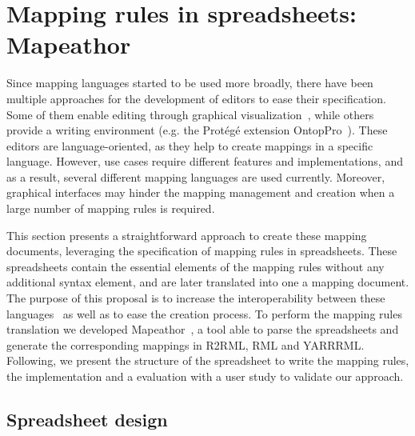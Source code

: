 \section{Mapping rules in spreadsheets: Mapeathor}
\label{sec:chp5_mapeathor}

Since mapping languages started to be used more broadly, there have been multiple approaches for the development of editors to ease their specification. Some of them enable editing through graphical visualization~\citep{heyvaert2016rmleditor,sicilia2017map}, while others provide a writing environment (e.g. the Protégé extension OntopPro~). These editors are language-oriented, as they help to create mappings in a specific language. However, use cases require different features and implementations, and as a result, several different mapping languages are used currently. Moreover, graphical interfaces may hinder the mapping management and creation when a large number of mapping rules is required. 


This section presents a straightforward approach to create these mapping documents, leveraging the  specification of mapping rules in spreadsheets. These spreadsheets contain the essential elements of the mapping rules without any additional syntax element, and are later translated into one a mapping document. The purpose of this proposal is to increase the interoperability between these languages~\citep{corcho2020towards, iglesias2022devising} as well as to ease the creation process. To perform the mapping rules translation we developed Mapeathor~\citep{iglesias-molina_2023_5973906}, a tool able to parse the spreadsheets and generate the corresponding mappings in R2RML, RML and YARRRML. Following, we present the structure of the spreadsheet to write the mapping rules, the implementation and a evaluation with a user study to validate our approach.

\subsection{Spreadsheet design}
\label{sec:chp5_spreadsheet_design}

